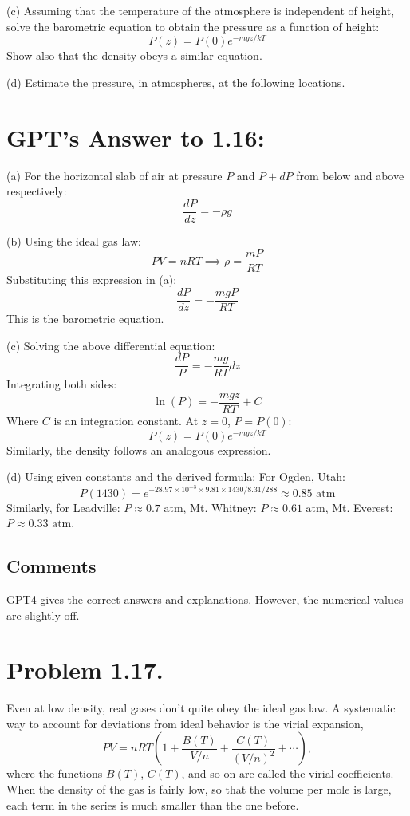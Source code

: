\documentclass[12pt]{article}
\begin{document}
(c) Assuming that the temperature of the atmosphere is independent of height, solve the barometric equation to obtain the pressure as a function of height: 
\[
P(z) = P(0)e^{-mgz/kT}
\]
Show also that the density obeys a similar equation.

(d) Estimate the pressure, in atmospheres, at the following locations.

\section*{GPT's Answer to 1.16:}

(a) For the horizontal slab of air at pressure \( P \) and \( P + dP \) from below and above respectively:
\[
\frac{dP}{dz} = -\rho g
\]

(b) Using the ideal gas law:
\[
PV = nRT \implies \rho = \frac{mP}{RT}
\]
Substituting this expression in (a):
\[
\frac{dP}{dz} = -\frac{mgP}{RT}
\]
This is the barometric equation.

(c) Solving the above differential equation:
\[
\frac{dP}{P} = -\frac{mg}{RT}dz
\]
Integrating both sides:
\[
\ln(P) = -\frac{mgz}{RT} + C
\]
Where \( C \) is an integration constant. At \( z = 0 \), \( P = P(0) \):
\[
P(z) = P(0)e^{-mgz/kT}
\]
Similarly, the density follows an analogous expression.

(d) Using given constants and the derived formula:
For Ogden, Utah:
\[
P(1430) = e^{-28.97 \times 10^{-3} \times 9.81 \times 1430/8.31/288} \approx 0.85 \text{ atm}
\]
Similarly, for Leadville: \( P \approx 0.7 \text{ atm} \), Mt. Whitney: \( P \approx 0.61 \text{ atm} \), Mt. Everest: \( P \approx 0.33 \text{ atm} \).

\subsection*{Comments}

GPT4 gives the correct answers and explanations. However, the numerical values are slightly off. 

\section*{Problem 1.17.}
Even at low density, real gases don't quite obey the ideal gas law. A systematic way to account for deviations from ideal behavior is the virial expansion,
\begin{equation}
P V = n R T \left(1 + \frac{B(T)}{V/n} + \frac{C(T)}{(V/n)^2} + \cdots \right),
\end{equation}
where the functions $B(T)$, $C(T)$, and so on are called the virial coefficients. When the density of the gas is fairly low, so that the volume per mole is large, each term in the series is much smaller than the one before.
\end{document}
